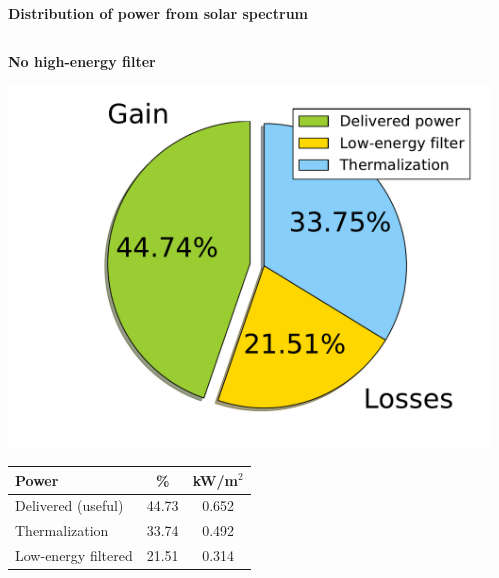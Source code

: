 \documentclass{beamer}
\begin{document}
\begin{frame}

\begin{center}
    \textbf{\Large Distribution of power from solar spectrum}
\end{center}

\begin{columns}

\begin{column}{0.48\textwidth}
 \begin{center}
    \textbf{No high-energy filter}

  \includegraphics[width=1.0\textwidth]{figures/bar_chart/pie_cart1.pdf} 

  \tiny
  \begin{tabular}{l||c||c}
    Power                &   \%    &  kW/m$^2$\\
    \hline
    \hline
    Delivered (useful)   & 44.73   & 0.652 \\
    Thermalization       & 33.74   & 0.492 \\
    Low-energy filtered  & 21.51   & 0.314 \\
  \end{tabular}
 \end{center}
\end{column}

\begin{column}{0.48\textwidth}


\end{column}
\end{columns}
\end{frame}
\end{document}
